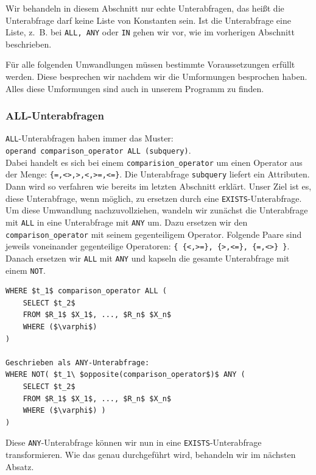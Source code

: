Wir behandeln in diesem Abschnitt nur echte Unterabfragen, das heißt die Unterabfrage darf keine Liste von Konstanten sein. Ist die Unterabfrage eine Liste, \mbox{z. B.} bei \verb|ALL, ANY| oder \verb|IN| gehen wir vor, wie im vorherigen Abschnitt beschrieben.

Für alle folgenden Umwandlungen müssen bestimmte Voraussetzungen erfüllt werden. Diese besprechen wir nachdem wir die Umformungen besprochen haben. Alles diese Umformungen sind auch in unserem Programm zu finden.

\subsubsection*{ALL-Unterabfragen}

\verb|ALL|-Unterabfragen haben immer das Muster:\\ \verb|operand comparison_operator ALL (subquery)|.\\ Dabei handelt es sich bei einem \verb|comparision_operator| um einen Operator aus der Menge: \verb|{=,<>,>,<,>=,<=}|. Die Unterabfrage \verb|subquery| liefert ein Attributen. Dann wird so verfahren wie bereits im letzten Abschnitt erklärt. Unser Ziel ist es, diese Unterabfrage, wenn möglich, zu ersetzen durch eine \verb|EXISTS|-Unterabfrage. Um diese Umwandlung nachzuvollziehen, wandeln wir zunächst die Unterabfrage mit \verb|ALL| in eine Unterabfrage mit \verb|ANY| um. Dazu ersetzen wir den \verb|comparison_operator| mit seinem gegenteiligem Operator. Folgende Paare sind jeweils voneinander gegenteilige Operatoren: \verb|{ {<,>=}, {>,<=}, {=,<>} }|. Danach ersetzen wir \verb|ALL| mit \verb|ANY| und kapseln die gesamte Unterabfrage mit einem \verb|NOT|. \newpage

\begin{lstlisting}[mathescape]
WHERE $t_1$ comparison_operator ALL (
	SELECT $t_2$
	FROM $R_1$ $X_1$, ..., $R_n$ $X_n$
	WHERE ($\varphi$)
)

Geschrieben als ANY-Unterabfrage:
WHERE NOT( $t_1\ $opposite(comparison_operator$)$ ANY (
	SELECT $t_2$
	FROM $R_1$ $X_1$, ..., $R_n$ $X_n$
	WHERE ($\varphi$) ) 
)
\end{lstlisting}

Diese \verb|ANY|-Unterabfrage können wir nun in eine \verb|EXISTS|-Unterabfrage transformieren. Wie das genau durchgeführt wird, behandeln wir im nächsten Absatz.


